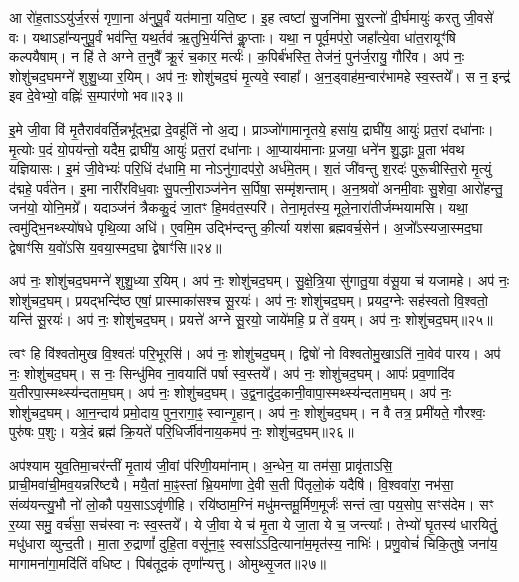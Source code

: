 आ रो॑ह॒ताऽऽयु॑र्ज॒रसं॑ गृणा॒ना अ॑नुपू॒र्वं यत॑माना॒ यति॒ष्ट। 
इ॒ह त्वष्टा॑ सु॒जनि॑मा सु॒रत्नो॑ दी॒र्घमायुः॑ करतु जी॒वसे॑ वः। 
यथाऽहा᳚न्यनुपू॒र्वं भव॑न्ति॒ यथ॒र्तव॑ ऋ॒तुभि॒र्यन्ति॑ कॢ॒प्ताः। 
यथा॒ न पूर्व॒मप॑रो॒ जहा᳚त्ये॒वा धा॑त॒रायूꣳ॑षि कल्पयैषाम्। 
न हि॑ ते अग्ने त॒नुवै᳚ क्रू॒रं च॒कार॒ मर्त्यः॑। 
क॒पिर्ब॑भस्ति॒ तेज॑नं॒ पुन॑र्ज॒रायु॒ गौरि॑व। 
अप॑ नः॒ शोशु॑चद॒घमग्ने॑ शुशु॒ध्या र॒यिम्। 
अप॑ नः॒ शोशु॑चद॒घं मृ॒त्यवे॒ स्वाहा᳚। 
अ॒न॒ड्वाह॑म॒न्वार॑भामहे स्व॒स्तये᳚। 
स न॒ इन्द्र॑ इव दे॒वेभ्यो॒ वह्निः॑ स॒म्पार॑णो भव॥२३॥

इ॒मे जी॒वा वि॑ मृ॒तैराव॑वर्ति॒न्नभू᳚द्भ॒द्रा दे॒वहू॑तिं नो अ॒द्य। 
प्राञ्जो॑गामानृ॒तये॒ हसा॑य॒ द्राघी॑य॒ आयुः॑ प्रत॒रां दधा॑नाः। 
मृ॒त्योः प॒दं यो॒पय॑न्तो॒ यदैम॒ द्राघी॑य॒ आयुः॑ प्रत॒रां दधा॑नाः। 
आ॒प्याय॑मानाः प्र॒जया॒ धने॑न शु॒द्धाः पू॒ता भ॑वथ यज्ञियासः। 
इ॒मं जी॒वेभ्यः॑ परि॒धिं द॑धामि॒ मा नोऽनु॑गा॒दप॑रो॒ अर्ध॑मे॒तम्। 
श॒तं जी॑वन्तु श॒रदः॑ पुरू॒चीस्ति॒रो मृ॒त्युं द॑द्महे॒ पर्व॑तेन। 
इ॒मा नारी॑रविध॒वाः सु॒पत्नी॒राञ्ज॑नेन स॒र्पिषा॒ सम्मृ॑शन्ताम्। 
अ॒न॒श्रवो॑ अनमी॒वाः सु॒शेवा॒ आरो॑हन्तु॒ जन॑यो॒ योनि॒मग्रे᳚। 
यदाञ्ज॑नं त्रैककु॒दं जा॒तꣳ हि॒मव॑त॒स्परि॑। 
तेना॒मृत॑स्य॒ मूले॒नारा॑तीर्जम्भयामसि। 
यथा॒ त्वमु॑द्भि॒नथ्स्यो॑षधे पृथि॒व्या अधि॑। 
ए॒वमि॒म उद्भि॑न्दन्तु की॒र्त्या यश॑सा ब्रह्मवर्च॒सेन॑। 
अ॒जो᳚ऽस्यजा॒स्मद॒घा द्वेषाꣳ॑सि य॒वो॑ऽसि य॒वया॒स्मद॒घा द्वेषाꣳ॑सि॥२४॥
\anuvakamend[भ॒व॒ ज॒म्भ॒या॒म॒सि॒ त्रीणि॑ च]

अप॑ नः॒ शोशु॑चद॒घमग्ने॑ शुशु॒ध्या र॒यिम्। 
अप॑ नः॒ शोशु॑चद॒घम्। 
सु॒क्षे॒त्रि॒या सु॑गातु॒या व॑सू॒या च॑ यजामहे। 
अप॑ नः॒ शोशु॑चद॒घम्। 
प्रयद्भन्दि॑ष्ठ एषां॒ प्रास्माका॑सश्च सू॒रयः॑। 
अप॑ नः॒ शोशु॑चद॒घम्। 
प्रयद॒ग्नेः सह॑स्वतो वि॒श्वतो॒ यन्ति॑ सू॒रयः॑। 
अप॑ नः॒ शोशु॑चद॒घम्। 
प्रयत्ते॑ अग्ने सू॒रयो॒ जाये॑महि॒ प्र ते॑ व॒यम्। 
अप॑ नः॒ शोशु॑चद॒घम्॥२५॥

त्वꣳ हि वि॑श्वतोमुख वि॒श्वतः॑ परि॒भूरसि॑। 
अप॑ नः॒ शोशु॑चद॒घम्। 
द्विषो॑ नो विश्वतोमु॒खाऽति॑ ना॒वेव॑ पारय। 
अप॑ नः॒ शोशु॑चद॒घम्। 
स नः॒ सिन्धु॑मिव ना॒वयाति॑ पर्\mbox{}षा स्व॒स्तये᳚। 
अप॑ नः॒ शोशु॑चद॒घम्। 
आपः॑ प्रव॒णादि॑व य॒तीरपा॒स्मथ्स्य॑न्दताम॒घम्। 
अप॑ नः॒ शोशु॑चद॒घम्। 
उ॒द्व॒नादु॑द॒कानी॒वापा॒स्मथ्स्य॑न्दताम॒घम्। 
अप॑ नः॒ शोशु॑चद॒घम्। 
आ॒न॒न्दाय॑ प्रमो॒दाय॒ पुन॒रागा॒ꣴ॒ स्वान्गृ॒हान्। 
अप॑ नः॒ शोशु॑चद॒घम्। 
न वै तत्र॒ प्रमी॑यते॒ गौरश्वः॒ पुरु॑षः प॒शुः। 
यत्रे॒दं ब्रह्म॑ क्रि॒यते॑ परि॒धिर्जीव॑नाय॒कमप॑ नः॒ शोशु॑चद॒घम्॥२६॥
\anuvakamend[अ॒घम॒घं च॒त्वारि॑ च]

अप॑श्याम युव॒तिमा॒चर॑न्तीं मृ॒ताय॑ जी॒वां प॑रिणी॒यमा॑नाम्। 
अ॒न्धेन॒ या तम॑सा॒ प्रावृ॑ताऽसि॒ प्राची॒मवा॑ची॒मव॒यन्नरि॑ष्ट्यै। 
मयै॒तां मा॒ꣴ॒स्तां भ्रि॒यमा॑णा दे॒वी स॒ती पि॑तृलो॒कं यदैषि॑। 
वि॒श्ववा॑रा॒ नभ॑सा॒ संव्य॑यन्त्यु॒भौ नो॑ लो॒कौ पय॒साऽऽवृ॑णीहि। 
रयि॑ष्ठाम॒ग्निं मधु॑मन्तमू॒र्मिण॒मूर्जः॑ सन्तं त्वा॒ पय॒सोप॒ सꣳस॑देम। 
सꣳ र॒य्या समु॒ वर्च॑सा॒ सच॑स्वा नः स्व॒स्तये᳚। 
ये जी॒वा ये च॑ मृ॒ता ये जा॒ता ये च॒ जन्त्याः᳚। 
तेभ्यो॑ घृ॒तस्य॑ धारयितुं॒ मधु॑धारा व्युन्द॒ती। 
मा॒ता रु॒द्राणां᳚ दुहि॒ता वसू॑ना॒ꣴ॒ स्वसा॑ऽऽदि॒त्याना॑म॒मृत॑स्य॒ नाभिः॑। 
प्रणु॒वोचं॑ चिकि॒तुषे॒ जना॑य॒ मागामना॑गा॒मदि॑तिं वधिष्ट। 
पिब॑तूद॒कं तृणा᳚न्यत्तु। 
ओमुथ्सृ॒जत॥२७॥
\anuvakamend[व॒धि॒ष्ट॒ द्वे च॑]

